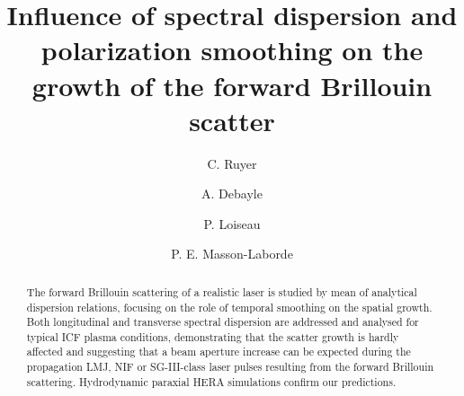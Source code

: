 \documentclass[
 reprint,
 amsmath,amssymb,
 aps,
]{revtex4-1}
\begin{document}
\title{ Influence of spectral dispersion and polarization smoothing on the  growth of the forward Brillouin scatter}
\author{C. Ruyer}
\author{A. Debayle}
\author{P. Loiseau}
\author{P. E. Masson-Laborde}

\begin{abstract} 
The forward Brillouin scattering of a realistic laser is studied by mean of analytical dispersion relations, focusing on the role of temporal smoothing on the spatial growth. Both   longitudinal and transverse  spectral dispersion are addressed and analysed  for  typical ICF plasma conditions,  demonstrating that 
the scatter growth is hardly affected and suggesting that a beam aperture increase can   be expected during the propagation LMJ, NIF or SG-III-class laser pulses resulting from the forward Brillouin scattering.  Hydrodynamic paraxial HERA simulations confirm our predictions.
\end{abstract}

\maketitle
\end{document}
